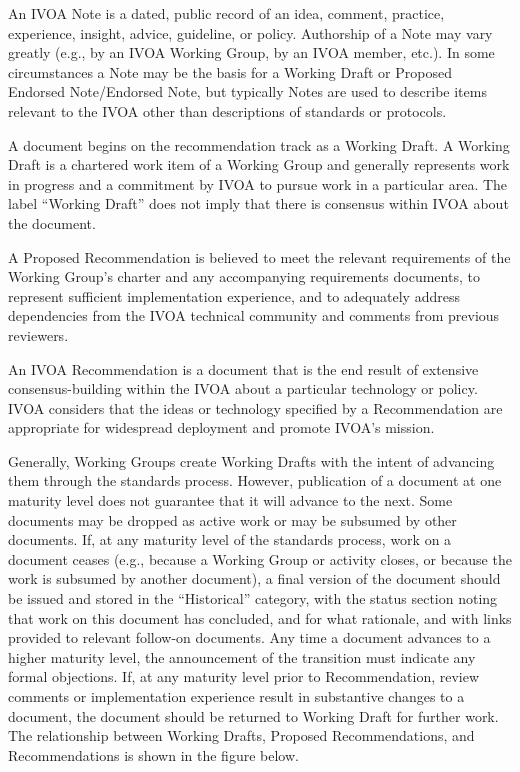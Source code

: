 \documentclass[11pt,a4paper]{ivoa}
\begin{document}
\begin{bigdescription}
\item[Note]  An IVOA Note is a dated, public record of an idea, comment,
practice, experience, insight, advice, guideline, or policy. Authorship
of a Note may vary greatly (e.g., by an IVOA Working Group, by an IVOA
member, etc.).  In some circumstances a Note may be the basis for a
Working Draft or Proposed Endorsed Note/Endorsed Note, but typically
Notes are used to describe items relevant to the IVOA other than
descriptions of standards or protocols.

\item[Working Draft]  A document begins on the recommendation track as a
Working Draft. A Working Draft is a chartered work item of a Working
Group and generally represents work in progress and a commitment by IVOA
to pursue work in a particular area.  The label ``Working Draft'' does not
imply that there is consensus within IVOA about the document.

\item[Proposed Recommendation]  A Proposed Recommendation is believed to meet
the relevant requirements of the Working Group's charter and any
accompanying requirements documents, to represent sufficient
implementation experience, and to adequately address dependencies from
the IVOA technical community and comments from previous reviewers.

\item[IVOA Recommendation]  An IVOA Recommendation is a document that is the
end result of extensive consensus-building within the IVOA about a
particular technology or policy.  IVOA considers that the ideas or
technology specified by a Recommendation are appropriate for widespread
deployment and promote IVOA's mission.
\end{bigdescription}

Generally, Working Groups create Working Drafts with the intent of
advancing them through the standards process. However, publication of a
document at one maturity level does not guarantee that it will advance
to the next. Some documents may be dropped as active work or may be
subsumed by other documents.  If, at any maturity level of the standards
process, work on a document ceases (e.g., because a Working Group or
activity closes, or because the work is subsumed by another document), a
final version of the document should be issued and stored in the
“Historical” category, with the status section noting that work on this
document has concluded, and for what rationale, and with links provided
to relevant follow-on documents. Any time a document advances to a
higher maturity level, the announcement of the transition must indicate
any formal objections.  If, at any maturity level prior to
Recommendation, review comments or implementation experience result in
substantive changes to a document, the document should be returned to
Working Draft for further work.  The relationship between Working
Drafts, Proposed Recommendations, and Recommendations is shown in the
figure below.
\end{document}
